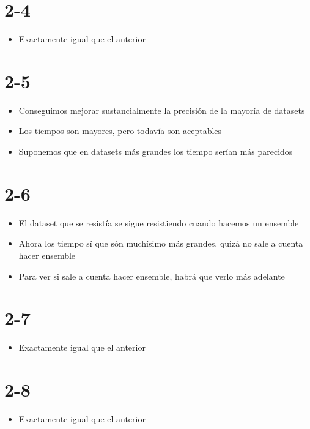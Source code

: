 \begin{note}
\section*{2-4}
\begin{itemize}
  \item Exactamente igual que el anterior
\end{itemize}

\section*{2-5}
\begin{itemize}
  \item Conseguimos mejorar sustancialmente la precisión de la mayoría de
  datasets
  \item Los tiempos son mayores, pero todavía son aceptables
  \item Suponemos que en datasets más grandes los tiempo serían más parecidos
\end{itemize}

\section*{2-6}
\begin{itemize}
  \item El dataset que se resistía se sigue resistiendo cuando hacemos un
  ensemble
  \item Ahora los tiempo sí que són muchísimo más grandes, quizá no sale a cuenta
  hacer ensemble
  \item Para ver si sale a cuenta hacer ensemble, habrá que verlo más adelante
\end{itemize}

\section*{2-7}
\begin{itemize}
  \item Exactamente igual que el anterior
\end{itemize}

\section{2-8}
\begin{itemize}
  \item Exactamente igual que el anterior
\end{itemize}


\end{note}
